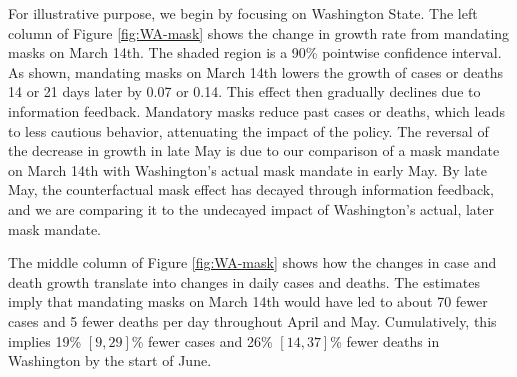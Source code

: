 \documentclass[11pt,reqno,letter]{amsart}
\theoremstyle{definition}
\begin{document}
For illustrative purpose, we begin by focusing on Washington State.
The left column of Figure \ref{fig:WA-mask} shows the change in
growth rate from mandating masks on March 14th. The shaded region is a
90\% pointwise confidence interval. As shown, mandating masks on March 14th lowers the growth of cases or deaths 14 or 21 days later by 0.07 or
0.14. This effect then gradually declines due to information
feedback. Mandatory masks reduce past cases or deaths, which leads to
less cautious behavior, attenuating the impact of the policy. The
reversal of the decrease in growth in late May is due to our
comparison of a mask mandate on March 14th with Washington's actual
mask mandate in early May. By late May, the counterfactual mask
effect has decayed through information feedback, and we are comparing
it to the undecayed impact of Washington's actual, later mask mandate.

The middle column of Figure \ref{fig:WA-mask} shows how the changes in
case and death growth translate into changes in daily cases and
deaths. The estimates imply that mandating masks on March 14th would
have led to about 70 fewer cases and 5 fewer deaths per day throughout
April and May. Cumulatively, this implies 19\% $[9,29]$\% fewer cases and 26\%
$[14,37]$\% fewer deaths in Washington by the start of June.
\end{document}
